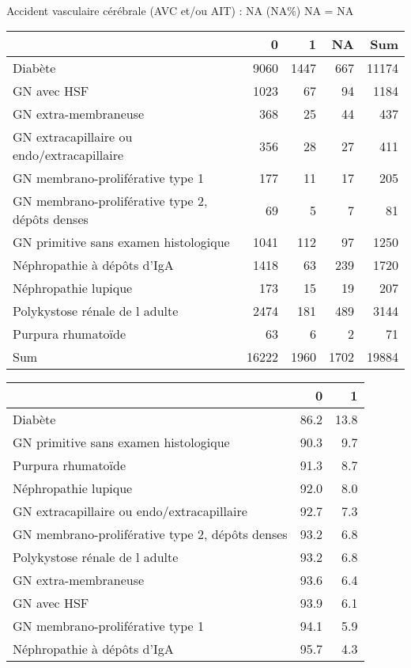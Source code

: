 \documentclass[11pt,a4paper]{article}\usepackage[]{graphicx}\usepackage[]{color}
\begin{document}
~\\

Accident vasculaire cérébrale (AVC et/ou AIT) : NA (NA\%) NA = NA



\begin{table}[H]
\centering
\begin{tabular}{lrrrr}
  \hline
 & 0 & 1 & NA & Sum \\ 
  \hline
Diabète & 9060 & 1447 & 667 & 11174 \\ 
  GN avec HSF & 1023 & 67 & 94 & 1184 \\ 
  GN extra-membraneuse & 368 & 25 & 44 & 437 \\ 
  GN extracapillaire ou endo/extracapillaire & 356 & 28 & 27 & 411 \\ 
  GN membrano-proliférative type 1 & 177 & 11 & 17 & 205 \\ 
  GN membrano-proliférative type 2, dépôts denses & 69 & 5 & 7 & 81 \\ 
  GN primitive sans examen histologique & 1041 & 112 & 97 & 1250 \\ 
  Néphropathie à dépôts d'IgA & 1418 & 63 & 239 & 1720 \\ 
  Néphropathie lupique & 173 & 15 & 19 & 207 \\ 
  Polykystose rénale de l adulte & 2474 & 181 & 489 & 3144 \\ 
  Purpura rhumatoïde & 63 & 6 & 2 & 71 \\ 
  Sum & 16222 & 1960 & 1702 & 19884 \\ 
   \hline
\end{tabular}
\end{table}
\begin{table}[H]
\centering
\begin{tabular}{lrr}
  \hline
 & 0 & 1 \\ 
  \hline
Diabète & 86.2 & 13.8 \\ 
  GN primitive sans examen histologique & 90.3 & 9.7 \\ 
  Purpura rhumatoïde & 91.3 & 8.7 \\ 
  Néphropathie lupique & 92.0 & 8.0 \\ 
  GN extracapillaire ou endo/extracapillaire & 92.7 & 7.3 \\ 
  GN membrano-proliférative type 2, dépôts denses & 93.2 & 6.8 \\ 
  Polykystose rénale de l adulte & 93.2 & 6.8 \\ 
  GN extra-membraneuse & 93.6 & 6.4 \\ 
  GN avec HSF & 93.9 & 6.1 \\ 
  GN membrano-proliférative type 1 & 94.1 & 5.9 \\ 
  Néphropathie à dépôts d'IgA & 95.7 & 4.3 \\ 
   \hline
\end{tabular}
\end{table}
\end{document}
